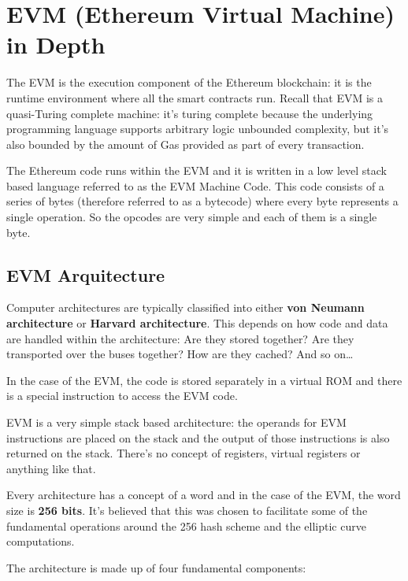 \section{EVM (Ethereum Virtual Machine) in
Depth}\label{evm-ethereum-virtual-machine-in-depth}

The EVM is the execution component of the Ethereum blockchain: it is the
runtime environment where all the smart contracts run. Recall that EVM
is a quasi-Turing complete machine: it's turing complete because the
underlying programming language supports arbitrary logic unbounded
complexity, but it's also bounded by the amount of Gas provided as part
of every transaction.

The Ethereum code runs within the EVM and it is written in a low level
stack based language referred to as the EVM Machine Code. This code
consists of a series of bytes (therefore referred to as a bytecode)
where every byte represents a single operation. So the opcodes are very
simple and each of them is a single byte.

\subsection{EVM Arquitecture}\label{evm-arquitecture}

Computer architectures are typically classified into either \textbf{von
Neumann architecture} or \textbf{Harvard architecture}. This depends on
how code and data are handled within the architecture: Are they stored
together? Are they transported over the buses together? How are they
cached? And so on\ldots{}

In the case of the EVM, the code is stored separately in a virtual ROM
and there is a special instruction to access the EVM code.

EVM is a very simple stack based architecture: the operands for EVM
instructions are placed on the stack and the output of those
instructions is also returned on the stack. There's no concept of
registers, virtual registers or anything like that.

Every architecture has a concept of a word and in the case of the EVM,
the word size is \textbf{256 bits}. It's believed that this was chosen
to facilitate some of the fundamental operations around the 256 hash
scheme and the elliptic curve computations.

The architecture is made up of four fundamental components:

